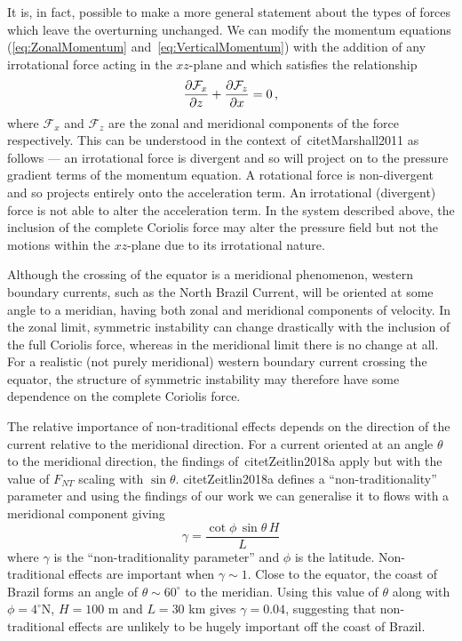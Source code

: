     It is, in fact, possible to make a more general statement about the types of forces which leave the overturning unchanged. We can modify the momentum equations (\ref{eq:ZonalMomentum} and~\ref{eq:VerticalMomentum}) with the addition of any irrotational force acting in the $xz$-plane and which satisfies the relationship
    \begin{equation}
        \pdv{\mathcal{F}_x}{z} + \pdv{\mathcal{F}_z}{x} = 0 \, ,
    \end{equation}
    where $\mathcal{F}_x$ and $\mathcal{F}_z$ are the zonal and meridional components of the force respectively. This can be understood in the context of~citet{Marshall2011} as follows --- an irrotational force is divergent and so will project on to the pressure gradient terms of the momentum equation. A rotational force is non-divergent and so projects entirely onto the acceleration term. An irrotational (divergent) force is not able to alter the acceleration term. In the system described above, the inclusion of the complete Coriolis force may alter the pressure field but not the motions within the $xz$-plane due to its irrotational nature.

    Although the crossing of the equator is a meridional phenomenon, western boundary currents, such as the North Brazil Current, will be oriented at some angle to a meridian, having both zonal and meridional components of velocity. In the zonal limit, symmetric instability can change drastically with the inclusion of the full Coriolis force, whereas in the meridional limit there is no change at all. For a realistic (not purely meridional) western boundary current crossing the equator, the structure of symmetric instability may therefore have some dependence on the complete Coriolis force.
    

    The relative importance of non-traditional effects depends on the direction of the current relative to the meridional direction. For a current oriented at an angle $\theta$ to the meridional direction, the findings of~citet{Zeitlin2018a} apply but with the value of $F_{NT}$ scaling with $\sin \theta$. citet{Zeitlin2018a} defines a ``non-traditionality'' parameter and using the findings of our work we can generalise it to flows with a meridional component giving
    \begin{equation}
        \gamma = \frac{\cot\phi\,\sin \theta\,H}{L}
    \end{equation}
    where $\gamma$ is the  ``non-traditionality parameter'' and $\phi$ is the latitude. Non-traditional effects are important when $\gamma \sim 1$. Close to the equator, the coast of Brazil forms an angle of $\theta \sim 60^\circ$ to the meridian. Using this value of $\theta$ along with $\phi = 4^\circ$N, $H = 100$ m and $L = 30$ km gives $\gamma = 0.04$, suggesting that non-traditional effects are unlikely to be hugely important off the coast of Brazil.